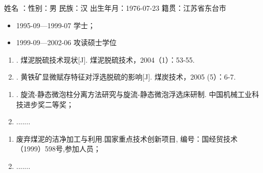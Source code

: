 \begin{resume}

姓名 ：\cumt@author \quad 性别：男 \quad 民族：汉 \quad 出生年月：1976-07-23 \quad 籍贯：江苏省东台市 \par
\begin{itemize}
    \setlength{\itemindent}{5.4em}
    \item[] 1995-09—1999-07  学士；
    \item[] 1999-09—2002-06  攻读硕士学位
\end{itemize}

\begin{enumerate}
    \setlength{\itemindent}{-1.5em}
    \item {}. 煤泥脱硫技术现状[J]. 煤泥脱硫技术，2004（1）：53-55.
    \item {}. 黄铁矿显微赋存特征对浮选脱硫的影响[J]. 煤炭技术，2005 (5）：6-7.
\end{enumerate}

\begin{enumerate}
    \setlength{\itemindent}{-1.5em}
    \item {}. 旋流-静态微泡柱分离方法研究与旋流-静态微泡浮选床研制. 中国机械工业科技进步奖二等奖；
    \item .......
\end{enumerate}

\begin{enumerate}
    \setlength{\itemindent}{-1.5em}
    \item 废弃煤泥的洁净加工与利用.国家重点技术创新项目, 编号：国经贸技术（1999）598号,参加人员；
    \item .......
\end{enumerate}

\end{resume}